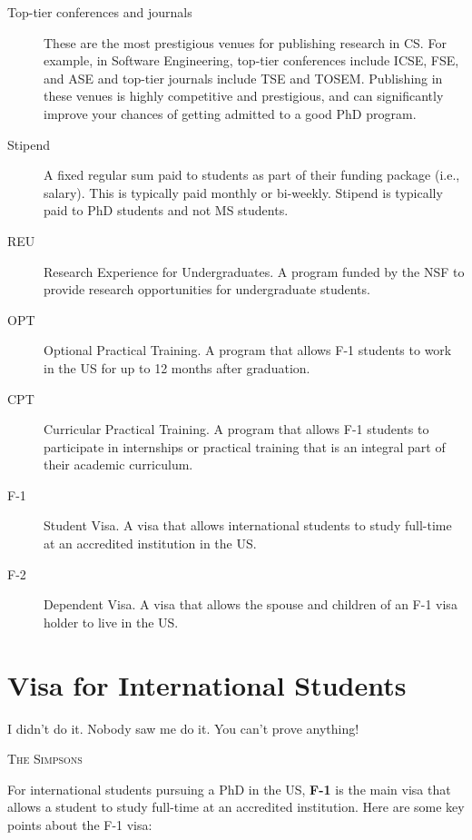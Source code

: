 \documentclass[oneside,11pt,dvipsnames]{book}
\begin{document}
\begin{description}
  \item [Top-tier conferences and journals] These are the most prestigious venues for publishing research in CS.  For example, in Software Engineering, top-tier conferences include ICSE, FSE, and ASE and top-tier journals include TSE and TOSEM.  Publishing in these venues is highly competitive and prestigious, and can significantly improve your chances of getting admitted to a good PhD program.

        \item [Stipend] A fixed regular sum paid to students as part of their funding package (i.e., salary). This is typically paid monthly or bi-weekly.  Stipend is typically paid to PhD students and not MS students.
  \item[REU] Research Experience for Undergraduates. A program funded by the NSF to provide research opportunities for undergraduate students.
    \item[OPT] Optional Practical Training. A program that allows F-1 students to work in the US for up to 12 months after graduation.
  \item[CPT] Curricular Practical Training. A program that allows F-1 students to participate in internships or practical training that is an integral part of their academic curriculum.
  \item[F-1] Student Visa. A visa that allows international students to study full-time at an accredited institution in the US.
  \item[F-2] Dependent Visa. A visa that allows the spouse and children of an F-1 visa holder to live in the US.
\end{description}

\chapter{Visa for International Students}\label{sec:visa}

\epigraph{\vspace{-0.2in} I didn’t do it. Nobody saw me do it. You can’t prove anything!}{\textsc{The Simpsons}}



For international students pursuing a PhD in the US, \textbf{F-1} is the main visa that allows a student to study full-time at an accredited institution.  Here are some key points about the F-1 visa:
\end{document}
